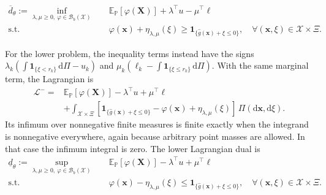 \documentclass[review,11pt,3p,authoryear,nopreprintline]{elsarticle}
\begin{document}
\begin{equation}
  \begin{aligned}
    \overline d_\theta:=\inf_{\lambda,\mu\ge0,\ \varphi\in\mathcal B_b(\mathcal X)}\quad&
    \mathbb E_{\mathbb P}\left[\varphi(\bm X)\right]+\lambda^\top u-\mu^\top\ell\\
    \text{s.t.}\quad&
    \varphi(\bm x)+\eta_{\lambda,\mu}(\xi)
    \ge\mathbf1_{\{\hat g(\bm x)+\xi\le0\}},
    \quad\forall(\bm x,\xi)\in\mathcal X\times\Xi.
  \end{aligned}
  \label{eq-upper-measure-dual}
\end{equation}

For the lower problem, the inequality terms instead have the signs
$\lambda_k(\int\mathbf1_{\{\xi<r_k\}}\,\mathrm d\Pi-u_k)$ and
$\mu_k(\ell_k-\int\mathbf1_{\{\xi\le r_k\}}\,\mathrm d\Pi)$.
With the same marginal term, the Lagrangian is
\begin{equation}
  \begin{aligned}
    \mathcal L^-={}&\mathbb E_{\mathbb P}\left[\varphi(\bm X)\right]
    -\lambda^\top u+\mu^\top\ell\\
    &+\int_{\mathcal X\times\Xi}
    \left[\mathbf1_{\{\hat g(\bm x)+\xi\le0\}}-\varphi(\bm x)
    +\eta_{\lambda,\mu}(\xi)\right]\,\Pi\left(\mathrm d\bm x,\mathrm d\xi\right).
  \end{aligned}
  \label{eq-lower-lagrangian}
\end{equation}
Its infimum over nonnegative finite measures is finite exactly when the integrand is nonnegative everywhere, again because arbitrary point masses are allowed. In that case the infimum integral is zero. The lower Lagrangian dual is
\begin{equation}
  \begin{aligned}
    \underline d_\theta:=\sup_{\lambda,\mu\ge0,\ \varphi\in\mathcal B_b(\mathcal X)}\quad&
    \mathbb E_{\mathbb P}\left[\varphi(\bm X)\right]-\lambda^\top u+\mu^\top\ell\\
    \text{s.t.}\quad&
    \varphi(\bm x)-\eta_{\lambda,\mu}(\xi)
    \le\mathbf1_{\{\hat g(\bm x)+\xi\le0\}},
    \quad\forall(\bm x,\xi)\in\mathcal X\times\Xi.
  \end{aligned}
  \label{eq-lower-measure-dual}
\end{equation}
\end{document}
